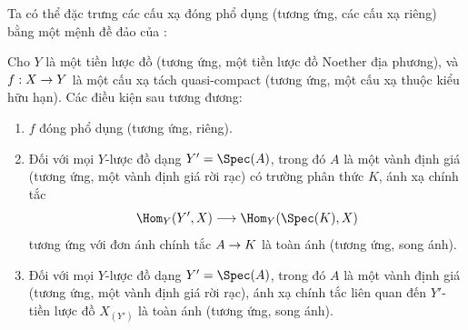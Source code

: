 \documentclass[oneside,10pt]{amsart}
\makeatletter
\newcommand{\ega@arrow}[2]{\mathchoice{#1}{#2}{#2}{#2}}
\renewcommand{\to}{\ega@arrow{\longrightarrow}{\rightarrow}}
\newcommand{\oldpage}[2][]{\marginnote{\normalfont\footnotesize\textbf{#1}~|~#2}\ignorespaces}
\let\EGAOriginalLabel\label
\renewcommand{\label}[1]{\phantomsection\EGAOriginalLabel{#1}}
\makeatother
\begin{document}
Ta có thể đặc trưng các cấu xạ đóng phổ dụng (tương ứng, các cấu xạ riêng) bằng một mệnh đề đảo của :
\begin{theorem}[7.3.8]
\label{II.7.3.8}
Cho $Y$ là một tiền lược đồ (tương ứng, một tiền lược đồ Noether địa phương), và $f:X\to Y$ là một cấu xạ tách quasi-compact (tương ứng, một cấu xạ thuộc kiểu hữu hạn).
Các điều kiện sau tương đương:
\begin{enumerate}
    \item[\rm{(a)}] $f$ đóng phổ dụng (tương ứng, riêng).
    \item[\rm{(b)}] Đối với mọi $Y$-lược đồ dạng $Y'=\Spec(A)$, trong đó $A$ là một vành định giá (tương ứng, một vành định giá rời rạc) có trường phân thức $K$, ánh xạ chính tắc
        \[
            \Hom_Y(Y',X) \to \Hom_Y(\Spec(K),X)
        \]
        tương ứng với đơn ánh chính tắc $A\to K$ là toàn ánh (tương ứng, song ánh).
\oldpage[II]{145}
  \item[\rm{(c)}] Đối với mọi $Y$-lược đồ dạng $Y'=\Spec(A)$, trong đó $A$ là một vành định giá (tương ứng, một vành định giá rời rạc), ánh xạ chính tắc  liên quan đến $Y'$-tiền lược đồ $X_{(Y')}$ là toàn ánh (tương ứng, song ánh).
\end{enumerate}
\end{theorem}
\end{document}
